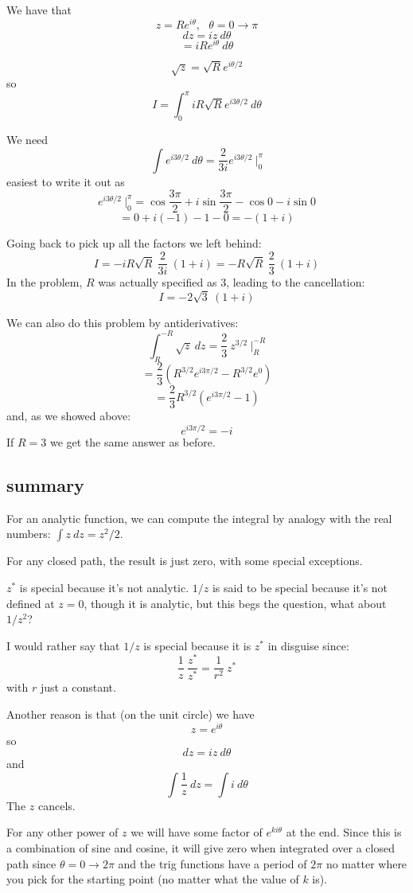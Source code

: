 \documentclass[11pt, oneside]{article}
\begin{document}
We have that 
\[ z = Re^{i\theta}, \ \ \ \theta = 0 \rightarrow \pi \]
\[ dz = iz \ d \theta \]
\[ = iRe^{i\theta} \ d \theta \]

\[ \sqrt{z} = \sqrt{R} e^{i\theta/2} \]
so
\[ I = \int_0^{\pi} iR \sqrt{R} e^{i3\theta/2} \ d \theta \]

We need
\[ \int e^{i3\theta/2} \ d \theta = \frac{2}{3i} e^{i3\theta/2} \ \bigg |_0^{\pi} \]
easiest to write it out as
\[ e^{i3\theta/2} \ \bigg |_0^{\pi} = \cos \frac{3\pi}{2} + i \sin  \frac{3\pi}{2} - \cos 0 - i \sin 0 \]
\[ = 0 + i(-1) - 1 - 0 = -(1+i) \]

Going back to pick up all the factors we left behind:
\[ I = -iR \sqrt{R} \ \frac{2}{3i} \ (1+i) = -R \sqrt{R} \ \frac{2}{3} \ (1+i) \]
In the problem, $R$ was actually specified as $3$, leading to the cancellation:
\[ I = - 2 \sqrt{3} \ (1+i) \]

We can also do this problem by antiderivatives:
\[ \int_R^{-R} \sqrt{z} \ dz = \frac{2}{3} \ z^{3/2} \ \bigg |_R^{-R}  \]
\[ = \frac{2}{3} ( R^{3/2} e^{i3\pi/2} - R^{3/2} e^0) \]
\[ = \frac{2}{3} R^{3/2} ( e^{i3\pi/2} - 1) \]
and, as we showed above:
\[ e^{i3\pi/2} = -i \]
If $R=3$ we get the same answer as before.

\subsection*{summary}

For an analytic function, we can compute the integral by analogy with the real numbers:  $\int z \ dz = z^2/2$.

For any closed path, the result is just zero, with some special exceptions.

$z^*$ is special because it's not analytic.  $1/z$ is said to be special because it's not defined at $z = 0$, though it is analytic, but this begs the question, what about $1/z^2$?

I would rather say that $1/z$ is special because it is $z^*$ in disguise since:
\[ \frac{1}{z} \ \frac{z^*}{z^*} = \frac{1}{r^2} \ z^* \]
with $r$ just a constant.

Another reason is that (on the unit circle) we have
\[ z = e^{i \theta} \]
so
\[ dz = i z \ d \theta \]
and
\[ \int \frac{1}{z} \ dz = \int i \ d \theta \]
The $z$ cancels.

For any other power of $z$ we will have some factor of $e^{ki\theta}$ at the end.  Since this is a combination of sine and cosine, it will give zero when integrated over a closed path since $\theta = 0 \rightarrow 2 \pi$ and the trig functions have a period of $2 \pi$ no matter where you pick for the starting point (no matter what the value of $k$ is).
\end{document}
